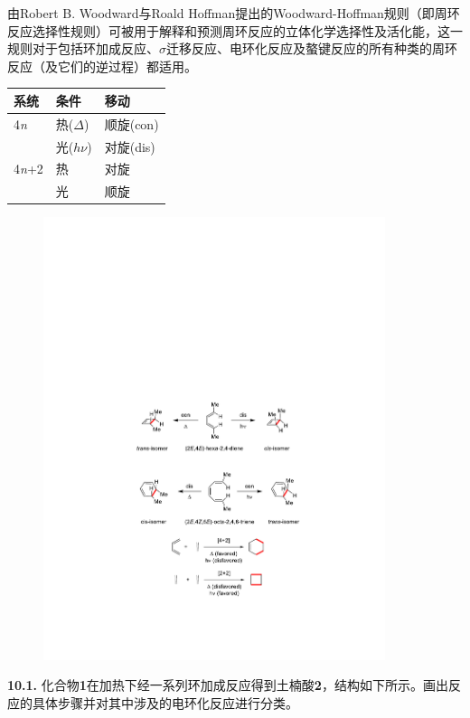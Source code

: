 由Robert B. Woodward与Roald Hoffman提出的Woodward-Hoffman规则（即周环反应选择性规则）可被用于解释和预测周环反应的立体化学选择性及活化能，这一规则对于包括环加成反应、$\sigma$迁移反应、电环化反应及螯键反应的所有种类的周环反应（及它们的逆过程）都适用。

\begin{longtable}[]{@{}lll@{}}
	\toprule
	\textbf{系统} & \textbf{条件} & \textbf{移动}\tabularnewline
	\midrule
	4\emph{n} & 热($\Delta$) & 顺旋(con)\tabularnewline
	& 光($h\nu$) & 对旋(dis)\tabularnewline
	\midrule
	4\emph{n}+2 & 热 & 对旋\tabularnewline
	& 光 & 顺旋\tabularnewline
	\bottomrule
\end{longtable}

\begin{figure}[h]
	\centering
	\includegraphics[width=10cm]{./pic/t10-1.pdf}
\end{figure}

\noindent\textbf{10.1.}
化合物\textbf{1}在加热下经一系列环加成反应得到土楠酸\textbf{2}，结构如下所示。画出反应的具体步骤并对其中涉及的电环化反应进行分类。

